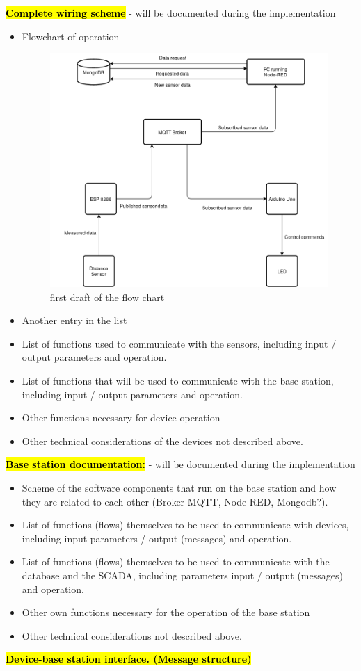 \documentclass{article}
\begin{document}
\textcolor{red}{\textbf{\hl{Complete wiring scheme }}} - will be documented during the implementation 
\begin{itemize}
	 \item Flowchart of operation  
	\begin{figure}[h]
		\center
		\includegraphics[scale=1]{flow.png}
		\caption{first draft of the flow chart}
		\label{sensorWithArduino}
	\end{figure}
	\item Another entry in the list
	\item List of functions used to communicate with the sensors, including input / output parameters and operation.
	\item List of functions that will be used to communicate with the base station, including input / output parameters and operation. 
	\item Other functions necessary for device operation
	\item Other technical considerations of the devices not described above. 
\end{itemize}
	
\textcolor{red}{\textbf{\hl{Base station documentation:}}} - will be documented during the implementation
\begin{itemize}
	\item Scheme of the software components that run on the base station and how they are related to each other (Broker MQTT, Node-RED, Mongodb?). 
	\item List of functions (flows) themselves to be used to communicate with devices, including input parameters / output (messages) and operation.
	\item List of functions (flows) themselves to be used to communicate with the database and the SCADA, including parameters input / output (messages) and operation. 
	\item Other own functions necessary for the operation of the base station
	\item Other technical considerations not described above. 
\end{itemize}
\textcolor{red}{\textbf{\hl{Device-base station interface. (Message structure)}}}
\end{document}
